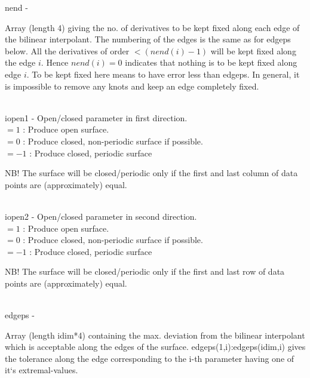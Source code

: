         \>\>    {\fov nend}\> - \>  \begin{minipg2}
                     Array (length 4) giving the no. of derivatives to be
                  kept fixed along each edge of the bilinear interpolant.
                  The numbering of the edges is the same as for edgeps below.
                  All the derivatives of order $< (nend(i)-1)$ will be kept
                  fixed along the edge $i$. Hence $nend(i)=0$ indicates that
                  nothing is to be kept fixed along edge $i$.
                  To be kept fixed here means to have error less than edgeps.
                  In general, it is impossible to remove any knots and keep
                  an edge completely fixed.
                               \end{minipg2}\\[0.8ex]
        \>\>   {\fov iopen1}\> - \> Open/closed parameter in first direction.\\
          \>\>\>\>  $= 1$  : Produce open surface.\\
          \>\>\>\>  $= 0$ : Produce closed, non-periodic surface if possible.\\
          \>\>\>\>  $= -1$ : Produce closed, periodic surface\\
        \>\>\>\>  \begin{minipg2}
                  NB! The surface will be closed/periodic only if the first 
                      and last column of data points are (approximately) equal.
                               \end{minipg2}\\[0.8ex]
        \>\>   {\fov iopen2}\> - \> Open/closed parameter in second direction.\\
          \>\>\>\>  $= 1$  : Produce open surface.\\
          \>\>\>\>  $= 0$ : Produce closed, non-periodic surface if possible.\\
          \>\>\>\>  $= -1$ : Produce closed, periodic surface\\
        \>\>\>\>  \begin{minipg2}
                  NB! The surface will be closed/periodic only if the first 
                      and last row of data points are (approximately) equal.
                               \end{minipg2}\\[0.8ex]
        \>\>    {\fov edgeps}\> - \>  \begin{minipg2}
                     Array (length idim*4) containing the max. deviation from
                  the bilinear interpolant which is acceptable along the
                  edges of the surface.
                  edgeps(1,i):edgeps(idim,i) gives the tolerance along
                  the edge corresponding to the i-th parameter having
                  one of it`s extremal-values.
                     \end{minipg2}\\[0.8ex]
